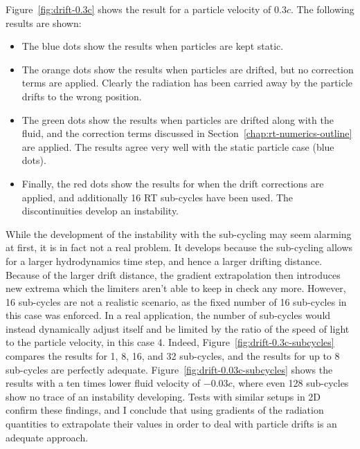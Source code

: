 Figure~\ref{fig:drift-0.3c} shows the result for a particle velocity of $0.3c$. The following
results are shown:

\begin{itemize}
 \item The blue dots show the results when particles are kept static.
 \item The orange dots show the results when particles are drifted, but no correction terms are
applied. Clearly the radiation has been carried away by the particle drifts to the wrong position.
 \item The green dots show the results when particles are drifted along with the fluid, and the
correction terms discussed in Section~\ref{chap:rt-numerics-outline} are applied. The results agree
very well with the static particle case (blue dots).
 \item Finally, the red dots show the results for when the drift corrections are applied, and
additionally 16 RT sub-cycles have been used. The discontinuities develop an instability.
\end{itemize}

While the development of the instability with the sub-cycling may seem alarming at first, it is in
fact not a real problem. It develops because the sub-cycling allows for a larger hydrodynamics time
step, and hence a larger drifting distance. Because of the larger drift distance, the gradient
extrapolation then introduces new extrema which the limiters aren't able to keep in check any more.
However, 16 sub-cycles are not a realistic scenario, as the fixed number of 16 sub-cycles in
this case was enforced. In a real application, the number of sub-cycles would instead dynamically
adjust itself and be limited by the ratio of the speed of light to the particle velocity, in this
case 4. Indeed, Figure~\ref{fig:drift-0.3c-subcycles} compares the results for 1, 8, 16, and 32
sub-cycles, and the results for up to 8 sub-cycles are perfectly adequate.
Figure~\ref{fig:drift-0.03c-subcycles} shows the results with a ten times lower fluid velocity of
$-0.03c$, where even 128 sub-cycles show no trace of an instability developing. Tests with similar
setups in 2D confirm these findings, and I conclude that using gradients of the radiation quantities
to extrapolate their values in order to deal with particle drifts is an adequate approach.



